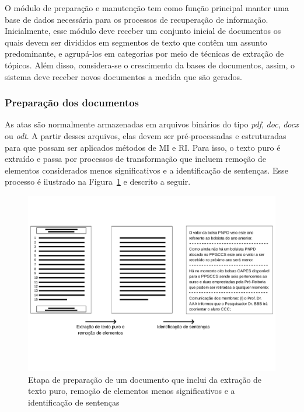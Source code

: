 O módulo de preparação e manutenção tem como função principal manter uma base de dados necessária para os processos de recuperação de informação. Inicialmente, esse módulo deve receber um conjunto inicial de documentos os quais devem ser divididos em segmentos de texto que contêm um assunto predominante, e agrupá-los em categorias por meio de técnicas de extração de tópicos. Além disso, considera-se o crescimento da bases de documentos, assim, o sistema deve receber novos documentos a medida que são gerados. 







\subsubsection{Preparação dos documentos}


As atas são normalmente armazenadas em arquivos binários do tipo \textit{pdf}, \textit{doc}, \textit{docx} ou \textit{odt}. A partir desses arquivos, elas devem ser pré-processadas e estruturadas para que possam ser aplicados métodos de MI e RI. Para isso, o texto puro é extraído e passa por processos de transformação que incluem remoção de elementos considerados menos significativos e a identificação de sentenças. Esse processo é ilustrado na Figura~\ref{fig:preprocessamento-segmentacao} e descrito a seguir.

\begin{center}
	\begin{figure}[h!]

		\includegraphics[trim={ 0 100 0 100 },clip,page=1,width=\textwidth]{conteudo/capitulos/figs/preparacao-docs.pdf}

		\caption{Etapa de preparação de um documento que inclui da extração de texto puro,  remoção de elementos menos significativos e a identificação de sentenças}
		\label{fig:preprocessamento-segmentacao}
	\end{figure}
\end{center}


